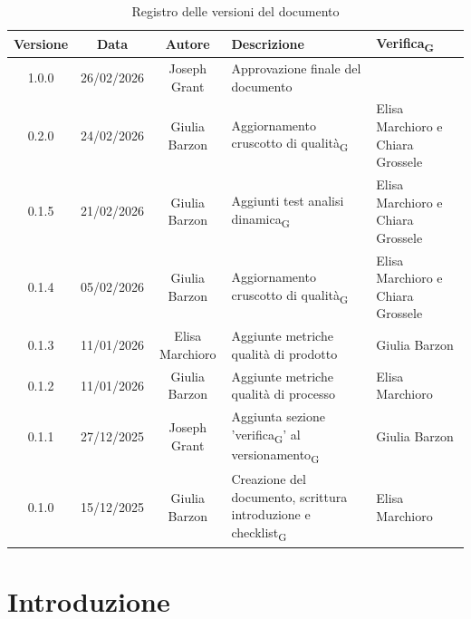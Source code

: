 \documentclass[11pt,a4paper]{article}
\newcommand{\gls}[1]{#1\textsubscript{G}}
\begin{document}
\begin{table}[H]
    \centering
    \begin{tabular}{|c|c|c|>{\raggedright\arraybackslash}p{}|p{}|}
        \hline
        \textbf{Versione} & \textbf{Data} & \textbf{Autore} & \textbf{Descrizione} & \textbf{\gls{Verifica}} \\
        \hline
        1.0.0 & 26/02/2026 & Joseph Grant & Approvazione finale del documento &  \\
        \hline
        0.2.0 & 24/02/2026 & Giulia Barzon & Aggiornamento \gls{cruscotto di qualità} & Elisa Marchioro e Chiara Grossele\\
        \hline
        0.1.5 & 21/02/2026 & Giulia Barzon & Aggiunti test \gls{analisi dinamica} & Elisa Marchioro e Chiara Grossele\\
        \hline
        0.1.4 & 05/02/2026 & Giulia Barzon & Aggiornamento \gls{cruscotto di qualità} & Elisa Marchioro e Chiara Grossele\\
        \hline
        0.1.3 & 11/01/2026 & Elisa Marchioro & Aggiunte metriche qualità di prodotto & Giulia Barzon \\
        \hline
        0.1.2 & 11/01/2026 & Giulia Barzon & Aggiunte metriche qualità di processo & Elisa Marchioro\\
        \hline
        0.1.1 & 27/12/2025 & Joseph Grant & Aggiunta sezione '\gls{verifica}' al \gls{versionamento} & Giulia Barzon\\
        \hline
        0.1.0 & 15/12/2025 & Giulia Barzon & Creazione del documento, scrittura introduzione e \gls{checklist} & Elisa Marchioro\\
        \hline
    \end{tabular}
    \caption{Registro delle versioni del documento}
    \label{tab:versionamento}
\end{table}

\newpage

\tableofcontents
\thispagestyle{empty}
\newpage

\setcounter{page}{1}

\section{Introduzione}
\end{document}
